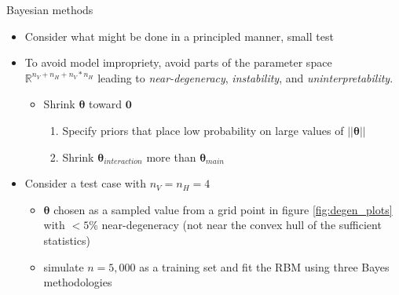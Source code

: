 \documentclass[ignorenonframetext,]{beamer}
\providecommand{\tightlist}{%
  \setlength{\itemsep}{0pt}\setlength{\parskip}{0pt}}
\theoremstyle{definition}
\newcommand{\nv}{{n_{\scriptscriptstyle V}}}
\newcommand{\nh}{{n_{\scriptscriptstyle H}}}
\begin{document}
\begin{frame}{Bayesian methods}
\protect\hypertarget{bayesian-methods}{}

\begin{itemize}
\tightlist
\item
  Consider what might be done in a principled manner, small test
\item
  To avoid model impropriety, avoid parts of the parameter space
  \(\mathbb{R}^{\nv + \nh + \nv*\nh}\) leading to
  \emph{near-degeneracy}, \emph{instability}, and
  \emph{uninterpretability}.

  \begin{itemize}
  \tightlist
  \item
    Shrink \(\boldsymbol \theta\) toward \(\boldsymbol 0\)

    \begin{enumerate}
    \tightlist
    \item
      Specify priors that place low probability on large values of
      \(||\boldsymbol \theta||\)
    \item
      Shrink \(\boldsymbol \theta_{interaction}\) more than
      \(\boldsymbol \theta_{main}\)
    \end{enumerate}
  \end{itemize}
\item
  Consider a test case with \(\nv = \nh = 4\)

  \begin{itemize}
  \tightlist
  \item
    \(\boldsymbol \theta\) chosen as a sampled value from a grid point
    in figure \ref{fig:degen_plots} with \(< 5\)\% near-degeneracy (not
    near the convex hull of the sufficient statistics)
  \item
    simulate \(n = 5,000\) as a training set and fit the RBM using three
    Bayes methodologies
  \end{itemize}
\end{itemize}

\end{frame}
\end{document}
